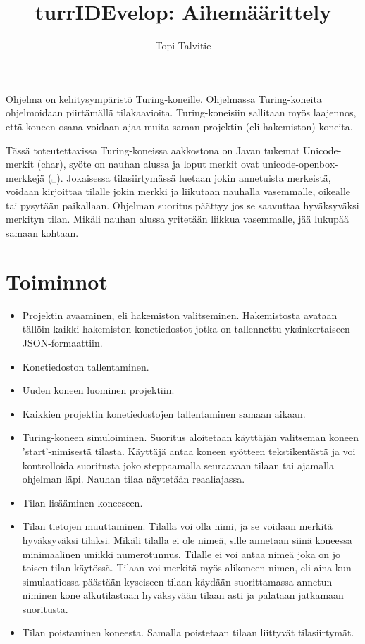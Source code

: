 \documentclass[a4paper, 11pt, finnish]{article}
\author{Topi Talvitie}
\title{turrIDEvelop: Aihemäärittely}
\begin{document}
\maketitle
Ohjelma on kehitysympäristö Turing-koneille. Ohjelmassa Turing-koneita
ohjelmoidaan piirtämällä tilakaavioita. Turing-koneisiin sallitaan myös
laajennos, että koneen osana voidaan ajaa muita saman projektin (eli
hakemiston) koneita.

Tässä toteutettavissa Turing-koneissa aakkostona on Javan tukemat
Unicode-merkit (char), syöte on nauhan alussa ja loput merkit ovat
unicode-openbox-merkkejä (␣). Jokaisessa tilasiirtymässä luetaan jokin
annetuista merkeistä, voidaan kirjoittaa tilalle jokin merkki ja liikutaan
nauhalla vasemmalle, oikealle tai pysytään paikallaan. Ohjelman suoritus
päättyy jos se saavuttaa hyväksyväksi merkityn tilan. Mikäli nauhan alussa
yritetään liikkua vasemmalle, jää lukupää samaan kohtaan.

\section*{Toiminnot}
\begin{itemize}
\item Projektin avaaminen, eli hakemiston valitseminen. Hakemistosta avataan
tällöin kaikki hakemiston konetiedostot jotka on tallennettu yksinkertaiseen
JSON-formaattiin.
\item Konetiedoston tallentaminen.
\item Uuden koneen luominen projektiin.
\item Kaikkien projektin konetiedostojen tallentaminen samaan aikaan.
\item Turing-koneen simuloiminen. Suoritus aloitetaan käyttäjän valitseman
koneen 'start'-nimisestä tilasta.
Käyttäjä antaa koneen syötteen tekstikentästä ja voi
kontrolloida suoritusta joko steppaamalla seuraavaan tilaan tai
ajamalla ohjelman läpi. Nauhan tilaa näytetään reaaliajassa.
\item Tilan lisääminen koneeseen.
\item Tilan tietojen muuttaminen. Tilalla voi olla nimi, ja se voidaan merkitä
hyväksyväksi tilaksi. Mikäli tilalla ei ole nimeä, sille
annetaan siinä koneessa minimaalinen uniikki numerotunnus. Tilalle ei voi
antaa nimeä joka on jo toisen tilan käytössä. Tilaan voi merkitä myös
alikoneen nimen, eli aina kun simulaatiossa päästään kyseiseen tilaan käydään
suorittamassa annetun niminen kone alkutilastaan hyväksyvään tilaan asti ja
palataan jatkamaan suoritusta.
\item Tilan poistaminen koneesta. Samalla poistetaan tilaan liittyvät
tilasiirtymät.
\end{itemize}
\end{document}

